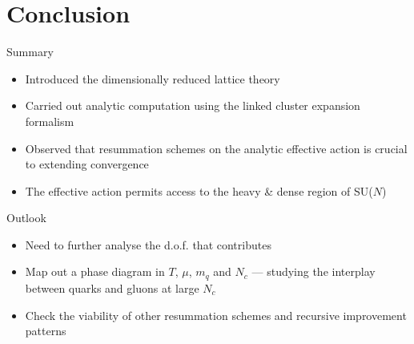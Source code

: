 \section{Conclusion}

\begin{frame}{Summary}

  \begin{itemize}
    \setlength\itemsep{1em}
    \item Introduced the \alert{dimensionally reduced} lattice theory
    \item Carried out analytic computation using the \alert{linked cluster expansion}
      formalism
    \item Observed that \alert{resummation schemes} on  the analytic
      effective action is crucial to extending convergence
    \item The effective action permits access to the \alert{heavy \& dense} region of
      SU($N$)
  \end{itemize}
  
\end{frame}

\begin{frame}{Outlook}

  \begin{itemize}
    \setlength\itemsep{1em}
    \item Need to further analyse the \alert{d.o.f.} that contributes
    \item Map out a phase diagram in $T$, $\mu$, $m_q$ and $N_c$ --- studying
      the interplay between quarks and gluons at large $N_c$
    \item Check the viability of other \alert{resummation schemes} and
      \alert{recursive improvement} patterns
  \end{itemize}

\end{frame}
